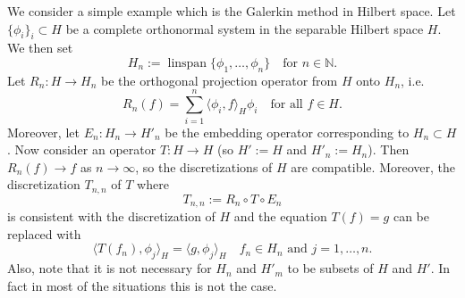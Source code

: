 \documentclass[a4paper]{article}
\newcommand{\N}{\mathbb{N}}
\DeclareMathOperator{\linspan}{linspan}
\newcommand{\ip}[2]{\langle #1,#2 \rangle}
\begin{document}
We consider a simple example which is the Galerkin method in Hilbert 
space. Let $\{ \phi_{i} \}_{i}\subset H$ be a 
complete orthonormal system in the separable Hilbert space $H$. We 
then set 
\[ H_{n} := \linspan \{\phi_{1},\ldots,\phi_{n} \}
   \quad\text{for $n\in\N$.}
\]
Let $R_{n} \colon H \to H_{n}$ be the orthogonal projection operator 
from $H$ onto $H_{n}$, i.e.\@
\[ R_{n}(f)=\sum_{i=1}^n \ip{\phi_{i}}{f}_{H}\phi_{i}
   \quad\text{for all $f\in H$.} \]
Moreover, let $E_{n}\colon H_{n} \to H'_{n}$ be the embedding operator 
corresponding to $H_{n}\subset H$. Now consider an
operator $T \colon H \to H$ (so $H':=H$ and $H'_{n}:=H_{n}$). Then 
$R_{n}(f)\to f$ as $n\to \infty$, so the discretizations of $H$ are 
compatible. Moreover, the discretization $T_{n,n}$ of $T$ where 
\[ T_{n,n}:=R_{n}\circ T \circ E_{n} \]
is consistent with the discretization of $H$ and the equation
$T(f)=g$ can be replaced with 
\[ \ip{T(f_{n})}{\phi_{j}}_{H}=\ip{g}{\phi_{j}}_{H}
   \quad\text{$f_{n}\in H_{n}$ and $j=1,\ldots,n$.} \]
Also, note that it is not necessary for $H_{n}$ and $H'_{m}$ to be 
subsets of $H$ and $H'$. In fact in most of the situations this is not the 
case. 
\end{document}
